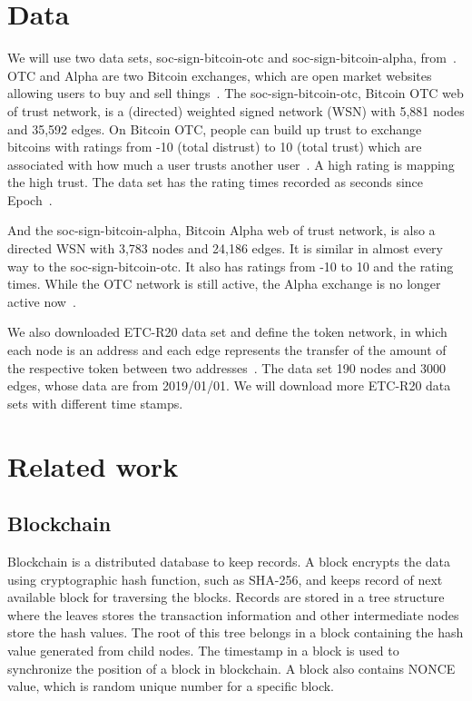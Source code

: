 \documentclass[onecolumn, 12pt]{IEEEtran}
\begin{document}
\section{Data}
We will use two data sets, soc-sign-bitcoin-otc and soc-sign-bitcoin-alpha, from~\cite{snapnets}.
OTC and Alpha are two Bitcoin exchanges, which are open market websites allowing users to buy and sell things~\cite{snapnets}.
The soc-sign-bitcoin-otc, Bitcoin OTC web of trust network, is a (directed) weighted signed network (WSN) with 5,881 nodes and 35,592 edges.
On Bitcoin OTC, people can build up trust to exchange bitcoins with ratings from -10 (total distrust) to 10 (total trust) which are associated with how much a user trusts another user~\cite{moindrot2017trust}. A high rating is mapping the high trust. The data set has the rating times recorded as seconds since Epoch~\cite{snapnets}.

And the soc-sign-bitcoin-alpha, Bitcoin Alpha web of trust network, is also a directed WSN with 3,783 nodes and 24,186 edges.
It is similar in almost every way to the soc-sign-bitcoin-otc. It also has ratings from -10 to 10 and the rating times. While the OTC network
is still active, the Alpha exchange is no longer active now~\cite{moindrot2017trust}.

We also downloaded ETC-R20 data set and define the token network, in which each node is an address and each edge represents the transfer of the amount of the respective token between two addresses~\cite{victormeasuring}. The data set 190 nodes and 3000 edges, whose data are from 2019/01/01. We will download more ETC-R20 data sets with different time stamps.

\section{Related work}
\subsection{Blockchain}
Blockchain is a distributed database to keep records.
A block encrypts the data using cryptographic hash function, such as SHA-256, and keeps record of next available block for traversing the blocks.
Records are stored in a tree structure where the leaves stores the transaction information and other intermediate nodes store the hash values. The root of this tree belongs in a block containing the hash value generated from child nodes.
The timestamp in a block is used to synchronize the position of a block in blockchain.
A block also contains NONCE value, which is random unique number for a specific block.
\end{document}
